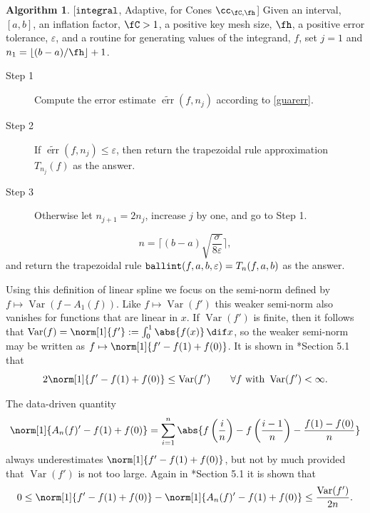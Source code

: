 \documentclass[]{article}
\DeclareMathOperator{\integ}{\texttt{\textup{integral}}}
\DeclareMathOperator{\ballinteg}{\texttt{\textup{ballint}}}
\DeclareMathOperator{\Var}{Var}
\DeclareMathOperator{\err}{err}
\newcommand{\terr}{\widetilde{\err}}
\theoremstyle{definition}
\newtheorem{algo}{Algorithm}
\theoremstyle{remark}
\begin{document}
\begin{algo}\label{adaptintegalgo} [$\integ$, Adaptive, for Cones $\cc_{\fC,\fh}$] Given an interval, $[a,b]$, an inflation factor, $\fC>1$, a positive key mesh size, $\fh$, a positive error tolerance, $\varepsilon$, and a routine for generating values of the integrand, $f$, set $j=1$ and $n_1 = \left \lfloor (b-a)/\fh \right \rfloor +1$.
\begin{description}
\item[Step 1] Compute the error estimate $\terr(f,n_j)$ according to \eqref{guarerr}.

\item [Step 2] If $\terr(f,n_j) \le \varepsilon$, then return the trapezoidal rule approximation $T_{n_j}(f)$ as the answer.  

\item [Step 3] Otherwise let $n_{j+1}=2 n_j$, increase $j$ by one, and go to Step 1.

\end{description}
\begin{equation}\label{algo1n}
n = \Bigg \lceil (b-a)\sqrt{\frac{\sigma}{8\varepsilon}} \Bigg \rceil,
\end{equation}
and return the trapezoidal rule $\ballinteg(f,a,b,\varepsilon)=T_n(f,a,b)$ as the answer.
\end{algo}
Using this definition of linear spline we focus on the semi-norm defined by $f \mapsto \Var(f-A_1(f))$.  Like $f \mapsto \Var(f')$ this weaker semi-norm also vanishes for functions that are linear in $x$.  If $\Var(f')$ is finite, then it follows that $\Var(f) = \norm[1]{f'}:=\int_0^1 \abs{f(x)} \, \dif x$, so the weaker semi-norm may be written as $f \mapsto \norm[1]{f'-f(1)+f(0)}$.  It is shown in *{Section 5.1} that 
\begin{equation} \label{weaknorm}
2 \norm[1]{f'-f(1)+f(0)} \le \Var(f') \qquad \forall f \text{ with } \Var(f')<\infty.
\end{equation}

The data-driven quantity 
\begin{equation} \label{weaknormalgo}
\norm[1]{A_n(f)'-f(1)+f(0)}= \sum_{i=1}^n \abs{f\left(\frac in \right)-f\left(\frac{i-1}n \right) - \frac{f(1)-f(0)}{n}}
\end{equation}
always underestimates $\norm[1]{f'-f(1)+f(0)}$, but not by much provided that $\Var(f')$ is not too large. Again in *{Section 5.1} it is shown that 
\begin{equation} \label{errweaknorm}
0 \le \norm[1]{f'-f(1)+f(0)} - \norm[1]{A_n(f)'-f(1)+f(0)} \le \frac{\Var(f')}{2n}.
\end{equation}
\end{document}
